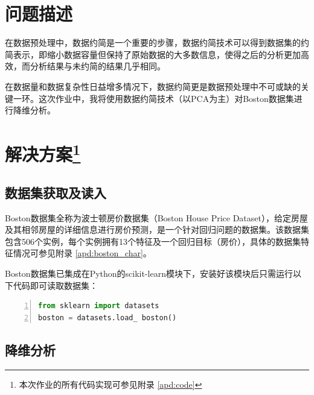 \documentclass[12pt,a4paper]{article}
\theoremstyle{definition}
\begin{document}
\noindent
\noindent{}

\section{问题描述}

在数据预处理中，数据约简是一个重要的步骤，数据约简技术可以得到数据集的约简表示，即缩小数据容量但保持了原始数据的大多数信息，使得之后的分析更加高效，而分析结果与未约简的结果几乎相同。

在数据量和数据复杂性日益增多情况下，数据约简更是数据预处理中不可或缺的关键一环。这次作业中，我将使用数据约简技术（以PCA为主）对Boston数据集进行降维分析。

\section{解决方案\protect\footnote{本次作业的所有代码实现可参见附录 \ref{apd:code}}}

\subsection{数据集获取及读入}

Boston数据集全称为波士顿房价数据集（Boston House Price Dataset），给定房屋及其相邻房屋的详细信息进行房价预测，是一个针对回归问题的数据集。该数据集包含506个实例，每个实例拥有13个特征及一个回归目标（房价），具体的数据集特征情况可参见附录 \ref{apd:boston_char}。

Boston数据集已集成在Python的scikit-learn模块下，安装好该模块后只需运行以下代码即可读取数据集：

\vspace{0.01\linewidth}

\begin{lstlisting}[language=Python,
numbers=left,
keywordstyle=\color{blue!70},
frame=shadowbox,
breaklines=True]
from sklearn import datasets
boston = datasets.load_ boston()
\end{lstlisting}

\subsection{降维分析}
\end{document}
